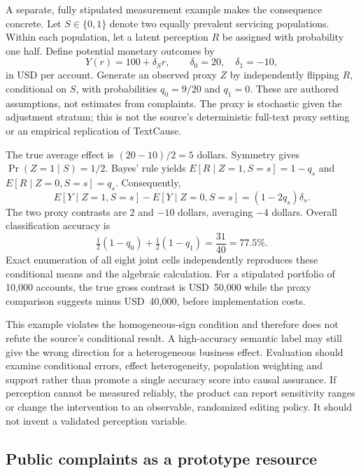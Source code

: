 A separate, fully stipulated measurement example makes the consequence concrete. Let $S\in\{0,1\}$ denote two equally prevalent servicing populations. Within each population, let a latent perception $R$ be assigned with probability one half. Define potential monetary outcomes by
\begin{equation}
 Y(r)=100+\delta_S r,\qquad \delta_0=20,\quad\delta_1=-10,
 \label{eq:exec28-lm-witness}
\end{equation}
in USD per account. Generate an observed proxy $Z$ by independently flipping $R$, conditional on $S$, with probabilities $q_0=9/20$ and $q_1=0$. These are authored assumptions, not estimates from complaints. The proxy is stochastic given the adjustment stratum; this is not the source's deterministic full-text proxy setting or an empirical replication of TextCause.

The true average effect is $(20-10)/2=5$ dollars. Symmetry gives $\Pr(Z=1\mid S)=1/2$. Bayes' rule yields $E[R\mid Z=1,S=s]=1-q_s$ and $E[R\mid Z=0,S=s]=q_s$. Consequently,
\begin{equation}
 E[Y\mid Z=1,S=s]-E[Y\mid Z=0,S=s]=(1-2q_s)\delta_s.
\end{equation}
The two proxy contrasts are $2$ and $-10$ dollars, averaging $-4$ dollars. Overall classification accuracy is
\begin{equation}
 \tfrac12(1-q_0)+\tfrac12(1-q_1)=\frac{31}{40}=77.5\%.
\end{equation}
Exact enumeration of all eight joint cells independently reproduces these conditional means and the algebraic calculation. For a stipulated portfolio of 10,000 accounts, the true gross contrast is USD~50,000 while the proxy comparison suggests minus USD~40,000, before implementation costs.~\citep{exec28_lm_reference}

This example violates the homogeneous-sign condition and therefore does not refute the source's conditional result. A high-accuracy semantic label may still give the wrong direction for a heterogeneous business effect. Evaluation should examine conditional errors, effect heterogeneity, population weighting and support rather than promote a single accuracy score into causal assurance. If perception cannot be measured reliably, the product can report sensitivity ranges or change the intervention to an observable, randomized editing policy. It should not invent a validated perception variable.

\subsection{Public complaints as a prototype resource}

